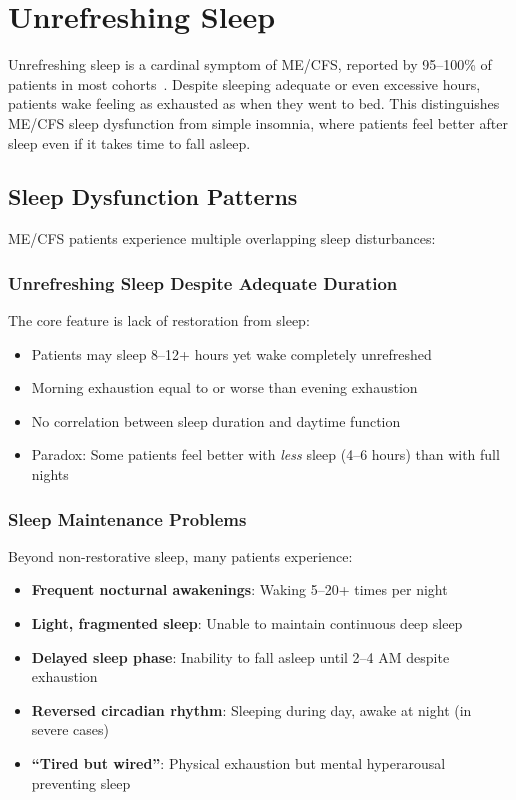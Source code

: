 \section{Unrefreshing Sleep}
\label{sec:sleep}

Unrefreshing sleep is a cardinal symptom of ME/CFS, reported by 95--100\% of patients in most cohorts~\cite{Jason2010sleepMECFS,Unger2016sleepPrevalence}. Despite sleeping adequate or even excessive hours, patients wake feeling as exhausted as when they went to bed. This distinguishes ME/CFS sleep dysfunction from simple insomnia, where patients feel better after sleep even if it takes time to fall asleep.

\subsection{Sleep Dysfunction Patterns}

ME/CFS patients experience multiple overlapping sleep disturbances:

\subsubsection{Unrefreshing Sleep Despite Adequate Duration}

The core feature is lack of restoration from sleep:
\begin{itemize}
    \item Patients may sleep 8--12+ hours yet wake completely unrefreshed
    \item Morning exhaustion equal to or worse than evening exhaustion
    \item No correlation between sleep duration and daytime function
    \item Paradox: Some patients feel better with \textit{less} sleep (4--6 hours) than with full nights
\end{itemize}

\subsubsection{Sleep Maintenance Problems}

Beyond non-restorative sleep, many patients experience:
\begin{itemize}
    \item \textbf{Frequent nocturnal awakenings}: Waking 5--20+ times per night
    \item \textbf{Light, fragmented sleep}: Unable to maintain continuous deep sleep
    \item \textbf{Delayed sleep phase}: Inability to fall asleep until 2--4 AM despite exhaustion
    \item \textbf{Reversed circadian rhythm}: Sleeping during day, awake at night (in severe cases)
    \item \textbf{``Tired but wired''}: Physical exhaustion but mental hyperarousal preventing sleep
\end{itemize}

